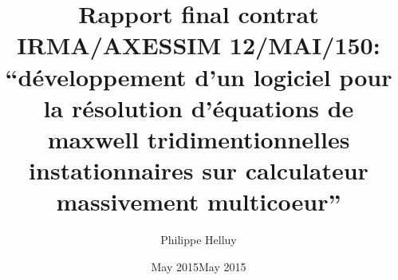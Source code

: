 \documentclass[12pt]{amsart}
\begin{document}
%

\title[Rapport final IRMA/AXESSIM 12/MAI/150]{Rapport final contrat IRMA/AXESSIM 12/MAI/150: ``développement d'un logiciel pour la résolution d'équations de maxwell tridimentionnelles instationnaires sur calculateur massivement multicoeur''}
\date{May 2015}
%
%
%
%
%

%
\author{Philippe Helluy}
\date{May 2015}
\end{document}
